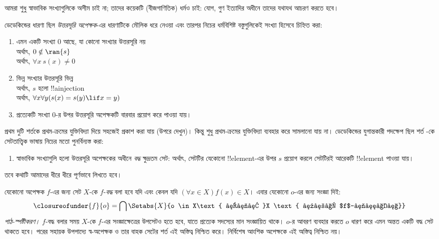 \documentclass[../../../include/open-logic-section]{subfiles}
\begin{document}

আমরা শুধু স্বাভাবিক সংখ্যাগুলিকে অসীম চাই না; তাদের কয়েকটি (বীজগাণিতিক) ধর্মও চাই: যোগ, গুণ ইত্যাদির অধীনে তাদের যথাযথ আচরণ করতে হবে।

ডেডেকিন্ডের ধারণা ছিল \emph{উত্তরসূরি অপেক্ষক}-এর ধারণাটিকে মৌলিক ধরে নেওয়া এবং তারপর নিচের ধর্মবিশিষ্ট বস্তুগুলিকেই সংখ্যা হিসেবে চিহ্নিত করা:
\begin{enumerate}
	\item এমন একটি সংখ্যা $0$ আছে, যা কোনো সংখ্যার উত্তরসূরি নয়
	\\অর্থাৎ, $0 \notin \ran{s}$
	\\অর্থাৎ, $\forall x\ s(x) \neq 0$
	\item ভিন্ন সংখ্যার উত্তরসূরি ভিন্ন
	\\অর্থাৎ, $s$ হলো !!a{injection}
	\\অর্থাৎ, $\forall x \forall y (s(x) = s(y) \lif x = y)$
	\item{} প্রত্যেকটি সংখ্যা $0$-র উপর উত্তরসূরি অপেক্ষকটি বারবার প্রয়োগ করে পাওয়া যায়।
\end{enumerate}
প্রথম দুটি শর্তকে প্রথম-ক্রমের যুক্তিবিদ্যা দিয়ে সহজেই প্রকাশ করা যায় (উপরে দেখুন)। কিন্তু শুধু প্রথম-ক্রমের যুক্তিবিদ্যা ব্যবহার করে  সামলানো যায় না। ডেডেকিন্ডের যুগান্তকারী পদক্ষেপ ছিল শর্ত -কে সেটতাত্ত্বিক ভাষায় নিচের মতো পুনর্বিন্যস্ত করা:
\begin{enumerate}
	\item[3$'$.] স্বাভাবিক সংখ্যাগুলি হলো উত্তরসূরি অপেক্ষকের অধীনে \emph{বদ্ধ} ক্ষুদ্রতম সেট: অর্থাৎ, সেটটির যেকোনো !!{element}-এর উপর $s$ প্রয়োগ করলে সেটটিরই আরেকটি !!{element} পাওয়া যায়।
\end{enumerate}
তবে কথাটি আমাদের ধীরে ধীরে পূর্ণভাবে লিখতে হবে।

\begin{defn}
	যেকোনো অপেক্ষক $f$-এর জন্য সেট $X$-কে $f$-\emph{বদ্ধ} বলা হবে {যদি এবং কেবল যদি} $(\forall x \in X)f(x) \in X$। এবার যেকোনো $o$-এর জন্য সংজ্ঞা দিই:
	$$\closureofunder{f}{o} = \bigcap\Setabs{X}{o \in X\text{ এবং }X
\text{ হলো $f$-বদ্ধ}}$$
\emph{পাঠ-স্পষ্টীকরণ।} $f$-বদ্ধ বলার সময় $X$-কে $f$-এর
সংজ্ঞাক্ষেত্রের উপসেটও হতে হবে, যাতে প্রত্যেক সদস্যের মান সংজ্ঞায়িত
থাকে। $o$-র আবরণ ব্যবহার করতে $o$ ধারণ করে এমন অন্তত একটি
বদ্ধ সেট থাকতে হবে। পরের সহায়ক উপপাদ্যে স্ব-অপেক্ষক ও তার বাহক
সেটের শর্ত এই অস্তিত্ব নিশ্চিত করে। নির্বিশেষ আংশিক অপেক্ষকে এই
অস্তিত্ব নিশ্চিত নয়।
\end{defn}
\end{document}

